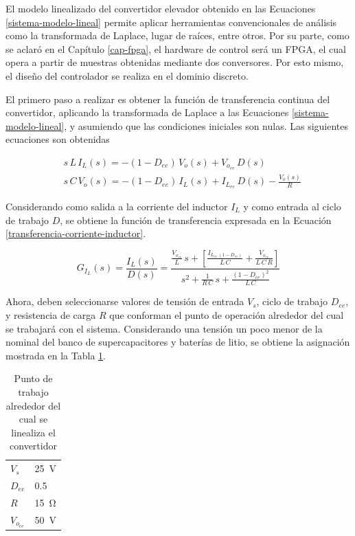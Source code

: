 El modelo linealizado del convertidor elevador obtenido en las Ecuaciones \ref{sistema-modelo-lineal} permite aplicar herramientas convencionales de análisis como la transformada de Laplace, lugar de raíces, entre otros. Por su parte, como se aclaró en el Capítulo \ref{cap-fpga}, el hardware de control será un FPGA, el cual opera a partir de muestras obtenidas mediante dos conversores. Por esto mismo, el diseño del controlador se realiza en el dominio discreto.

El primero paso a realizar es obtener la función de transferencia continua del convertidor, aplicando la transformada de Laplace a las Ecuaciones \ref{sistema-modelo-lineal}, y asumiendo que las condiciones iniciales son nulas. Las siguientes ecuaciones son obtenidas

\begin{equation}
  \begin{split}
    & s \, L \, I_L(s) = - \left( 1 - D_{ee} \right) \, V_o(s) + V_{o_{ee}} \, D(s)
    \\
    & s \, C \, V_o(s) = - \left( 1 - D_{ee} \right) \, I_L(s) + I_{L_{ee}} \, D(s) - \frac{V_o(s)}{R}
    \label{sistema-modelo-laplace}
  \end{split}
\end{equation}

Considerando como salida a la corriente del inductor $I_L$ y como entrada al ciclo de trabajo $D$, se obtiene la función de transferencia expresada en la Ecuación \ref{transferencia-corriente-inductor}.

\begin{equation}
  \boxed{G_{I_L}(s) = \frac{I_L(s)}{D(s)} = \frac{\frac{V_{o_{ee}}}{L} \, s + \left[ \frac{I_{L_{ee} \, (1 - D_{ee})}}{L \, C} + \frac{V_{o_{ee}}}{L\,C\,R} \right]}{s^2 + \frac{1}{R\,C} \, s + \frac{\left( 1 - D_{ee} \right)^2}{L \, C}}}
  \label{transferencia-corriente-inductor}
\end{equation}

Ahora, deben seleccionarse valores de tensión de entrada $V_s$, ciclo de trabajo $D_{ee}$, y resistencia de carga $R$ que conforman el punto de operación alrededor del cual se trabajará con el sistema. Considerando una tensión un poco menor de la nominal del banco de supercapacitores y baterías de litio, se obtiene la asignación mostrada en la Tabla \ref{punto-trabajo-convertidor}.

\begin{table}[hbt!]
  \centering
  \begin{tabular}{l|l}
  $V_s$     & \SI{25}{\volt} \\
  $D_{ee}$    & 0.5 \\
  $R$        & \SI{15}{\ohm}  \\
  $V_{o_{ee}}$ & \SI{50}{\volt} 
  \end{tabular}
  \caption{Punto de trabajo alrededor del cual se linealiza el convertidor}
  \label{punto-trabajo-convertidor}
\end{table}

